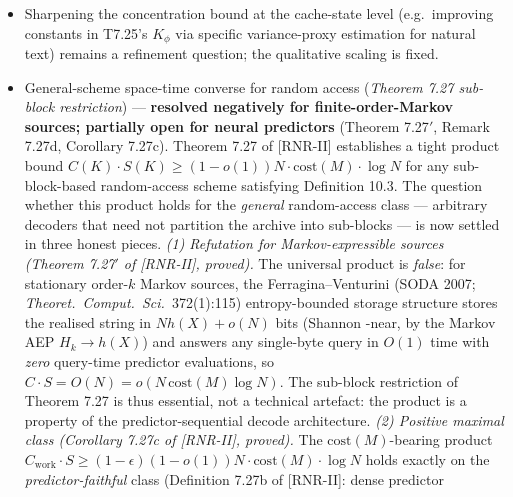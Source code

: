\documentclass[
]{article}
\begin{document}
\begin{itemize}
  Aldous--Diaconis 1986 coupling for permutation-like Markov chains
  on LRU stack states, would tighten the constant. Theorem 7.26's ([RNR-II])
  qualitative $\sqrt{Q}$-Hoeffding scaling holds for any positive
  $\gamma_{\rm LRU}$; only the multiplicative constant is at stake.
  The non-IRM (workload-dependent) case --- where LRU concentration
  may genuinely fail, as shown by the $A, B, A, B, \ldots$
  counterexample (2026-05) against $C=1$ --- remains
  out-of-scope of this paper's IRM hypothesis and may require
  workload-specific concentration analysis.
\item
  Sharpening the concentration bound at the cache-state level
  (e.g.\ improving constants in T7.25's $K_\phi$ via specific
  variance-proxy estimation for natural text) remains a refinement
  question; the qualitative scaling is fixed.
\item
  General-scheme space-time converse for random access
  (\emph{Theorem 7.27 sub-block restriction}) --- \textbf{resolved
  negatively for finite-order-Markov sources; partially open for neural
  predictors} (Theorem 7.27$'$, Remark 7.27d, Corollary 7.27c).
  Theorem 7.27 of [RNR-II] establishes a tight product bound $C(K) \cdot S(K) \geq
  (1 - o(1)) N \cdot \mathrm{cost}(M) \cdot \log N$ for any
  sub-block-based random-access scheme satisfying Definition 10.3. The
  question whether this product holds for the \emph{general}
  random-access class --- arbitrary decoders that need not partition the
  archive into sub-blocks --- is now settled in three honest pieces.
  \emph{(1) Refutation for Markov-expressible sources (Theorem 7.27$'$ of [RNR-II],
  proved).} The universal product is \emph{false}: for stationary
  order-$k$ Markov sources, the Ferragina--Venturini (SODA 2007;
  \emph{Theoret.\ Comput.\ Sci.}\ 372(1):115) entropy-bounded storage
  structure stores the realised string in $N h(X) + o(N)$ bits (Shannon
  -near, by the Markov AEP $H_k \to h(X)$) and answers any single-byte
  query in $O(1)$ time with \emph{zero} query-time predictor
  evaluations, so $C \cdot S = O(N) = o(N\,\mathrm{cost}(M)\log N)$. The
  sub-block restriction of Theorem 7.27 is thus essential, not a
  technical artefact: the product is a property of the
  predictor-sequential decode architecture. \emph{(2) Positive maximal
  class (Corollary 7.27c of [RNR-II], proved).} The $\mathrm{cost}(M)$-bearing
  product $C_{\mathrm{work}} \cdot S \geq (1-\epsilon)(1-o(1)) N \cdot
  \mathrm{cost}(M) \cdot \log N$ holds exactly on the
  \emph{predictor-faithful} class (Definition 7.27b of [RNR-II]: dense predictor

\end{itemize}
\end{document}
